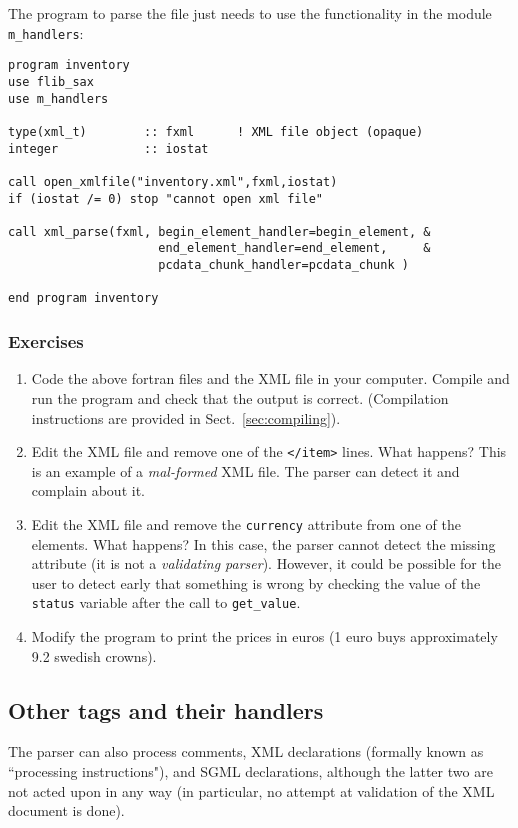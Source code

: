 \documentclass[11pt]{article}
\begin{document}
The program to parse the file just needs to use the functionality in
the module \texttt{m\_handlers}:
%
\begin{verbatim}
program inventory
use flib_sax
use m_handlers

type(xml_t)        :: fxml      ! XML file object (opaque)
integer            :: iostat    

call open_xmlfile("inventory.xml",fxml,iostat)
if (iostat /= 0) stop "cannot open xml file"

call xml_parse(fxml, begin_element_handler=begin_element, &
                     end_element_handler=end_element,     &
                     pcdata_chunk_handler=pcdata_chunk )
                     
end program inventory

\end{verbatim}
%
\subsubsection{Exercises}
\begin{enumerate}
\item Code the above fortran files and the XML file in your
computer. Compile and run the program and check that the output is
correct. (Compilation instructions are provided in
Sect.~\ref{sec:compiling}).
\item Edit the XML file and remove one of the \texttt{</item>}
lines. What happens? This is an example of a \textsl{mal-formed} XML
file. The parser can detect it and complain about it.
\item Edit the XML file and remove the \texttt{currency} attribute
from one of the elements. What happens? In this case, the parser
cannot detect the missing attribute (it is not a \textsl{validating
parser}). However, it could be possible for the user to detect early
that something is wrong by checking the value of the \texttt{status}
variable after the call to \texttt{get\_value}.
\item Modify the program to print the prices in euros (1 euro buys
approximately 9.2 swedish crowns).
\end{enumerate}

\subsection{Other tags and their handlers}

The parser can also process comments, XML declarations (formally known
as ``processing instructions"), and SGML declarations, although the
latter two are not acted upon in any way (in particular, no attempt at
validation of the XML document is done).
\end{document}
